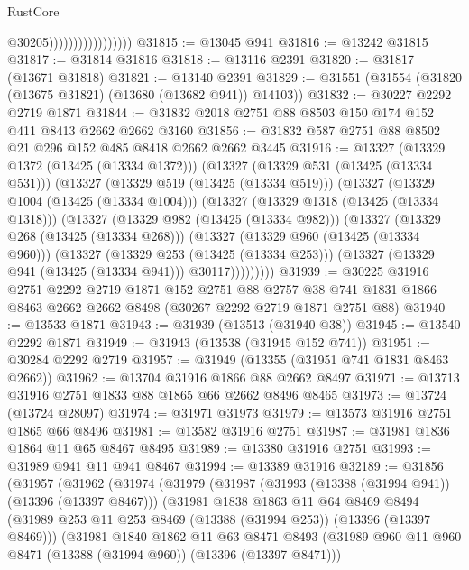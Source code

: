 \begin{lexlean}{RustCore}
\begin{coremodule}
                                      @30205)))))))))))))))))
@31815 := @13045 @941
@31816 := @13242 @31815
@31817 := @31814 @31816
@31818 := @13116 @2391
@31820 := @31817 (@13671 @31818)
@31821 := @13140 @2391
@31829 := @31551 (@31554 (@31820 (@13675 @31821) (@13680 (@13682 @941)) @14103))
@31832 := @30227 @2292 @2719 @1871
@31844 := @31832 @2018 @2751 @88 @8503 @150 @174 @152 @411 @8413 @2662 @2662 @3160
@31856 := @31832 @587 @2751 @88 @8502 @21 @296 @152 @485 @8418 @2662 @2662 @3445
@31916 := @13327
    (@13329 @1372 (@13425 (@13334 @1372)))
    (@13327
      (@13329 @531 (@13425 (@13334 @531)))
      (@13327
        (@13329 @519 (@13425 (@13334 @519)))
        (@13327
          (@13329 @1004 (@13425 (@13334 @1004)))
          (@13327
            (@13329 @1318 (@13425 (@13334 @1318)))
            (@13327
              (@13329 @982 (@13425 (@13334 @982)))
              (@13327
                (@13329 @268 (@13425 (@13334 @268)))
                (@13327
                  (@13329 @960 (@13425 (@13334 @960)))
                  (@13327
                    (@13329 @253 (@13425 (@13334 @253)))
                    (@13327 (@13329 @941 (@13425 (@13334 @941))) @30117)))))))))
@31939 := @30225
    @31916
    @2751
    @2292
    @2719
    @1871
    @152
    @2751
    @88
    @2757
    @38
    @741
    @1831
    @1866
    @8463
    @2662
    @2662
    @8498
    (@30267 @2292 @2719 @1871 @2751 @88)
@31940 := @13533 @1871
@31943 := @31939 (@13513 (@31940 @38))
@31945 := @13540 @2292 @1871
@31949 := @31943 (@13538 (@31945 @152 @741))
@31951 := @30284 @2292 @2719
@31957 := @31949 (@13355 (@31951 @741 @1831 @8463 @2662))
@31962 := @13704 @31916 @1866 @88 @2662 @8497
@31971 := @13713 @31916 @2751 @1833 @88 @1865 @66 @2662 @8496 @8465
@31973 := @13724 (@13724 @28097)
@31974 := @31971 @31973
@31979 := @13573 @31916 @2751 @1865 @66 @8496
@31981 := @13582 @31916 @2751
@31987 := @31981 @1836 @1864 @11 @65 @8467 @8495
@31989 := @13380 @31916 @2751
@31993 := @31989 @941 @11 @941 @8467
@31994 := @13389 @31916
@32189 := @31856
    (@31957
      (@31962
        (@31974
          (@31979
            (@31987
              (@31993 (@13388 (@31994 @941)) (@13396 (@13397 @8467)))
              (@31981
                @1838
                @1863
                @11
                @64
                @8469
                @8494
                (@31989 @253 @11 @253 @8469 (@13388 (@31994 @253)) (@13396 (@13397 @8469)))
                (@31981
                  @1840
                  @1862
                  @11
                  @63
                  @8471
                  @8493
                  (@31989 @960 @11 @960 @8471 (@13388 (@31994 @960)) (@13396 (@13397 @8471)))

\end{coremodule}
\end{lexlean}
